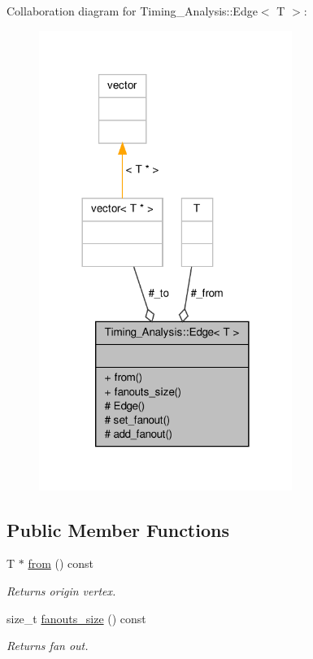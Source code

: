 Collaboration diagram for Timing\-\_\-\-Analysis\-:\-:Edge$<$ T $>$\-:\nopagebreak
\begin{figure}[H]
\begin{center}
\leavevmode
\includegraphics[width=233pt]{classTiming__Analysis_1_1Edge__coll__graph}
\end{center}
\end{figure}
\subsection*{Public Member Functions}
\begin{DoxyCompactItemize}
\item 
T $\ast$ \hyperlink{classTiming__Analysis_1_1Edge_a47020ea89fd9fde438adc814a731a23d}{from} () const 
\begin{DoxyCompactList}\small\item\em Returns origin vertex. \end{DoxyCompactList}\item 
size\-\_\-t \hyperlink{classTiming__Analysis_1_1Edge_a60c70172e973450774a8ec5d4dadbcb5}{fanouts\-\_\-size} () const 
\begin{DoxyCompactList}\small\item\em Returns fan out. \end{DoxyCompactList}\end{DoxyCompactItemize}
